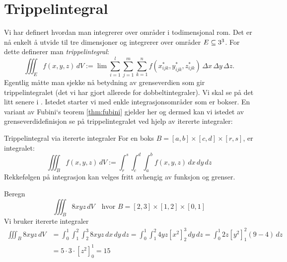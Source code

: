 \section{Trippelintegral}

Vi har definert hvordan man integrerer over områder i todimensjonal rom. Det er nå enkelt å utvide til tre dimensjoner og integrerer over områder $E \subseteq 3^3$. For dette definerer man \emph{trippelintegral}:
\[
\iiint_E f(x, y, z)\, dV := \lim \sum_{i=1}^{l} \sum_{j=1}^{m} \sum_{k=1}^{n} f(x^{*}_{ijk}, y^{*}_{ijk}, z^{*}_{ijk}) \, \Delta x \, \Delta y \, \Delta z.
\]
Egentlig måtte man sjekke nå betydning av grenseverdien som gir trippelintegralet (det vi har gjort allerede for dobbeltintegraler). Vi skal se på det litt senere i . Istedet starter vi med enkle integrasjonsområder som er bokser.  En variant av Fubini`s teorem \ref{thm:fubini} gjelder her og dermed kan vi istedet av grenseverdidefinisjon se på trippelintegralet ved hjelp av itererte integraler:

\begin{defn}{Trippelintegral via itererte integraler}
For en boks $B = [a,b] \times [c,d] \times [r,s]$, er integralet:
\[
\iiint_B f(x, y, z)\, dV := \int_r^s \int_c^d \int_a^b f(x, y, z)\, dx\, dy\, dz
\]
Rekkefølgen på integrasjon kan velges fritt avhengig av funksjon og grenser.
\end{defn}

\begin{eks}{} Beregn 
\[
\iiint_B 8xyz\, dV \quad \text{hvor } B = [2, 3] \times [1, 2] \times [0, 1]
\]
Vi bruker itererte integraler
\begin{align*}
\iiint_B 8xyz\, dV&=\int_0^1 \int_1^2 \int_2^3 8xyz \, dx\,dy\,dz = \int_0^1 \int_1^2 4yz[x^2]_2^3\, dy\, dz = \int_0^1 2z[y^2]_1^2 (9-4)\,dz\\
&= 5\cdot 3 \cdot [z^2]_0^1 =15
\end{align*}
\end{eks}

